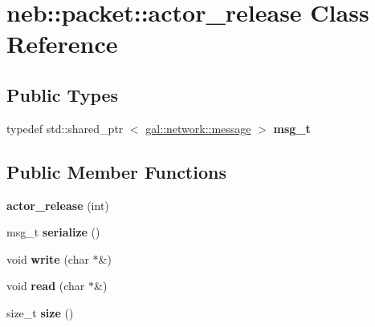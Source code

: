 \hypertarget{classneb_1_1packet_1_1actor__release}{\section{neb\-:\-:packet\-:\-:actor\-\_\-release \-Class \-Reference}
\label{classneb_1_1packet_1_1actor__release}
}
\subsection*{\-Public \-Types}
\begin{DoxyCompactItemize}
\item 
\hypertarget{classneb_1_1packet_1_1actor__release_a00cd43364472a514dd494ff623b38435}{typedef std\-::shared\-\_\-ptr\*
$<$ \hyperlink{classgal_1_1network_1_1message}{gal\-::network\-::message} $>$ {\bfseries msg\-\_\-t}}\label{classneb_1_1packet_1_1actor__release_a00cd43364472a514dd494ff623b38435}

\end{DoxyCompactItemize}
\subsection*{\-Public \-Member \-Functions}
\begin{DoxyCompactItemize}
\item 
\hypertarget{classneb_1_1packet_1_1actor__release_a427941df801ea77f69c914b2cc15519e}{{\bfseries actor\-\_\-release} (int)}\label{classneb_1_1packet_1_1actor__release_a427941df801ea77f69c914b2cc15519e}

\item 
\hypertarget{classneb_1_1packet_1_1actor__release_ae798345bb4f2a39ebaba785036d1da89}{msg\-\_\-t {\bfseries serialize} ()}\label{classneb_1_1packet_1_1actor__release_ae798345bb4f2a39ebaba785036d1da89}

\item 
\hypertarget{classneb_1_1packet_1_1actor__release_a4ac4e4dd9da7391390d84e3549a590ff}{void {\bfseries write} (char $\ast$\&)}\label{classneb_1_1packet_1_1actor__release_a4ac4e4dd9da7391390d84e3549a590ff}

\item 
\hypertarget{classneb_1_1packet_1_1actor__release_a510a1b4586257e3bd25766e2f29f4239}{void {\bfseries read} (char $\ast$\&)}\label{classneb_1_1packet_1_1actor__release_a510a1b4586257e3bd25766e2f29f4239}

\item 
\hypertarget{classneb_1_1packet_1_1actor__release_a8068e8fa32dc9e51670dcea7e20ef8d6}{size\-\_\-t {\bfseries size} ()}\label{classneb_1_1packet_1_1actor__release_a8068e8fa32dc9e51670dcea7e20ef8d6}

\end{DoxyCompactItemize}
